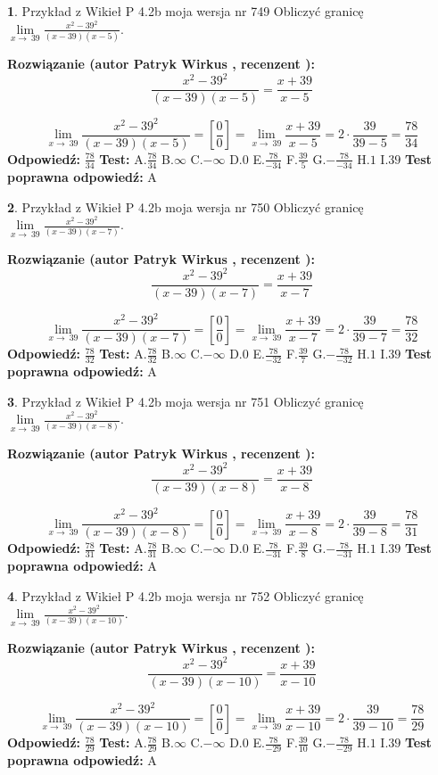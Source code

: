 \documentclass[12pt, a4paper]{article}
\theoremstyle{definition} %
\newtheorem{zad}{}
\newcommand{\zadStart}[1]{\begin{zad}#1\newline}
\newcommand{\zadStop}{\end{zad}}
\newcommand{\rozwStart}[2]{\noindent \textbf{Rozwiązanie (autor #1 , recenzent #2): }\newline}
\newcommand{\rozwStop}{\newline}
\newcommand{\odpStart}{\noindent \textbf{Odpowiedź:}\newline}
\newcommand{\odpStop}{\newline}
\newcommand{\testStart}{\noindent \textbf{Test:}\newline}
\newcommand{\testStop}{\newline}
\newcommand{\kluczStart}{\noindent \textbf{Test poprawna odpowiedź:}\newline}
\newcommand{\kluczStop}{\newline}
\begin{document}
\zadStart{Przykład z Wikieł P 4.2b moja wersja nr 749}
Obliczyć granicę $\lim\limits_{x\to\ 39}\frac{x^{2}-39^{2}}{(x-39)(x-5)}$.
\zadStop
\rozwStart{Patryk Wirkus}{}
$$\frac{x^{2}-39^{2}}{(x-39)(x-5)}=\frac{x+39}{x-5}$$

$$\lim\limits_{x\to\ 39}\frac{x^{2}-39^{2}}{(x-39)(x-5)}=[\frac{0}{0}]=\lim\limits_{x\to\ 39}\frac{x+39}{x-5}=2 \cdot \frac{39}{39-5} = \frac{78}{34}$$
\rozwStop
\odpStart
$\frac{78}{34}$
\odpStop
\testStart
A.$\frac{78}{34}$
B.$\infty$
C.$-\infty$
D.$0$
E.$\frac{78}{-34}$
F.$\frac{39}{5}$
G.$-\frac{78}{-34}$
H.$1$
I.$39$
\testStop
\kluczStart
A
\kluczStop



\zadStart{Przykład z Wikieł P 4.2b moja wersja nr 750}
Obliczyć granicę $\lim\limits_{x\to\ 39}\frac{x^{2}-39^{2}}{(x-39)(x-7)}$.
\zadStop
\rozwStart{Patryk Wirkus}{}
$$\frac{x^{2}-39^{2}}{(x-39)(x-7)}=\frac{x+39}{x-7}$$

$$\lim\limits_{x\to\ 39}\frac{x^{2}-39^{2}}{(x-39)(x-7)}=[\frac{0}{0}]=\lim\limits_{x\to\ 39}\frac{x+39}{x-7}=2 \cdot \frac{39}{39-7} = \frac{78}{32}$$
\rozwStop
\odpStart
$\frac{78}{32}$
\odpStop
\testStart
A.$\frac{78}{32}$
B.$\infty$
C.$-\infty$
D.$0$
E.$\frac{78}{-32}$
F.$\frac{39}{7}$
G.$-\frac{78}{-32}$
H.$1$
I.$39$
\testStop
\kluczStart
A
\kluczStop



\zadStart{Przykład z Wikieł P 4.2b moja wersja nr 751}
Obliczyć granicę $\lim\limits_{x\to\ 39}\frac{x^{2}-39^{2}}{(x-39)(x-8)}$.
\zadStop
\rozwStart{Patryk Wirkus}{}
$$\frac{x^{2}-39^{2}}{(x-39)(x-8)}=\frac{x+39}{x-8}$$

$$\lim\limits_{x\to\ 39}\frac{x^{2}-39^{2}}{(x-39)(x-8)}=[\frac{0}{0}]=\lim\limits_{x\to\ 39}\frac{x+39}{x-8}=2 \cdot \frac{39}{39-8} = \frac{78}{31}$$
\rozwStop
\odpStart
$\frac{78}{31}$
\odpStop
\testStart
A.$\frac{78}{31}$
B.$\infty$
C.$-\infty$
D.$0$
E.$\frac{78}{-31}$
F.$\frac{39}{8}$
G.$-\frac{78}{-31}$
H.$1$
I.$39$
\testStop
\kluczStart
A
\kluczStop



\zadStart{Przykład z Wikieł P 4.2b moja wersja nr 752}
Obliczyć granicę $\lim\limits_{x\to\ 39}\frac{x^{2}-39^{2}}{(x-39)(x-10)}$.
\zadStop
\rozwStart{Patryk Wirkus}{}
$$\frac{x^{2}-39^{2}}{(x-39)(x-10)}=\frac{x+39}{x-10}$$

$$\lim\limits_{x\to\ 39}\frac{x^{2}-39^{2}}{(x-39)(x-10)}=[\frac{0}{0}]=\lim\limits_{x\to\ 39}\frac{x+39}{x-10}=2 \cdot \frac{39}{39-10} = \frac{78}{29}$$
\rozwStop
\odpStart
$\frac{78}{29}$
\odpStop
\testStart
A.$\frac{78}{29}$
B.$\infty$
C.$-\infty$
D.$0$
E.$\frac{78}{-29}$
F.$\frac{39}{10}$
G.$-\frac{78}{-29}$
H.$1$
I.$39$
\testStop
\kluczStart
A
\kluczStop
\end{document}
